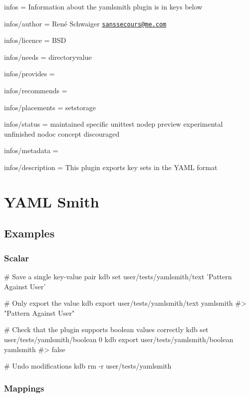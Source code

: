 
\begin{DoxyItemize}
\item infos = Information about the yamlsmith plugin is in keys below
\item infos/author = René Schwaiger \href{mailto:sanssecours@me.com}{\tt sanssecours@me.\+com}
\item infos/licence = B\+SD
\item infos/needs = directoryvalue
\item infos/provides =
\item infos/recommends =
\item infos/placements = setstorage
\item infos/status = maintained specific unittest nodep preview experimental unfinished nodoc concept discouraged
\item infos/metadata =
\item infos/description = This plugin exports key sets in the Y\+A\+ML format
\end{DoxyItemize}\hypertarget{autotoc_md947_src_plugins_yamlsmith_README_md}{}\section{Y\+A\+M\+L Smith}\label{autotoc_md947_src_plugins_yamlsmith_README_md}
\hypertarget{autotoc_md947_autotoc_md948}{}\subsection{Examples}\label{autotoc_md947_autotoc_md948}
\hypertarget{autotoc_md947_autotoc_md949}{}\subsubsection{Scalar}\label{autotoc_md947_autotoc_md949}

\begin{DoxyCode}
# Save a single key-value pair
kdb set user/tests/yamlsmith/text 'Pattern Against User'

# Only export the value
kdb export user/tests/yamlsmith/text yamlsmith
#> "Pattern Against User"

# Check that the plugin supports boolean values correctly
kdb set user/tests/yamlsmith/boolean 0
kdb export user/tests/yamlsmith/boolean yamlsmith
#> false

# Undo modifications
kdb rm -r user/tests/yamlsmith
\end{DoxyCode}
\hypertarget{autotoc_md947_autotoc_md950}{}\subsubsection{Mappings}\label{autotoc_md947_autotoc_md950}


